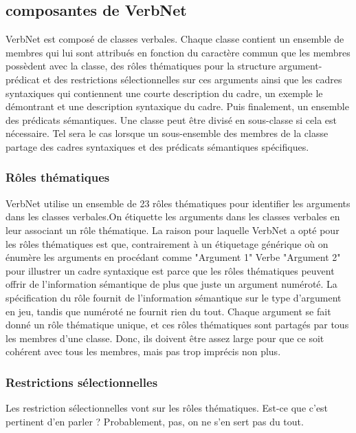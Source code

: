 \documentclass[12pt,maitrise,frenchb,natbib,twoside,initial]{dms}
\numberwithin{equation}{section}
\numberwithin{table}{chapter}
\numberwithin{figure}{chapter}
\begin{document}
\subsection {composantes de VerbNet}  

VerbNet est composé de classes verbales. Chaque classe contient un ensemble de membres qui lui sont attribués en fonction du caractère commun que les membres possèdent avec la classe, des rôles thématiques pour la structure argument-prédicat et des restrictions sélectionnelles sur ces arguments ainsi que les cadres syntaxiques qui contiennent une courte description du cadre, un exemple le démontrant et une description syntaxique du cadre. Puis finalement, un ensemble des prédicats sémantiques. Une classe peut être divisé en sous-classe si cela est nécessaire. Tel sera le cas lorsque un sous-ensemble des membres de la classe partage des cadres syntaxiques et des prédicats sémantiques spécifiques.

\subsubsection{Rôles thématiques}

VerbNet utilise un ensemble de 23 rôles thématiques pour identifier les arguments dans les classes verbales.On étiquette les arguments dans les classes verbales en leur associant un rôle thématique. La raison pour laquelle VerbNet a opté pour les rôles thématiques est que, contrairement à un étiquetage générique où on énumère les arguments en procédant comme "Argument 1" Verbe "Argument 2" pour illustrer un cadre syntaxique est parce que les rôles thématiques peuvent offrir de l'information sémantique de plus que juste un argument numéroté. La spécification du rôle fournit de l'information sémantique sur le type d'argument en jeu, tandis que numéroté ne fournit rien du tout. Chaque argument se fait donné un rôle thématique unique, et ces rôles thématiques sont partagés par tous les membres d'une classe. Donc, ils doivent être assez large pour que ce soit cohérent avec tous les membres, mais pas trop imprécis non plus.

\subsubsection{Restrictions sélectionnelles}

Les restriction sélectionnelles vont sur les rôles thématiques. Est-ce que c'est pertinent d'en parler ? Probablement, pas, on ne s'en sert pas du tout. 
\end{document}
